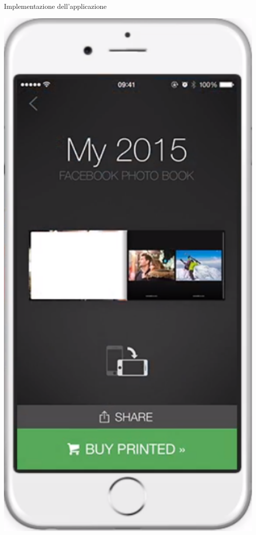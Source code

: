 \begin{frame}{Implementazione dell'applicazione}
\begin{minipage}{0.49\textwidth}
\begin{minipage}{0.32\textwidth}
				\end{minipage}
				\begin{minipage}{0.32\textwidth}
					\includegraphics[width=1.0\textwidth]{capitolo_3/immagini/schermata_di_visualizzazione.png}

\end{minipage}
\end{minipage}
\end{frame}
